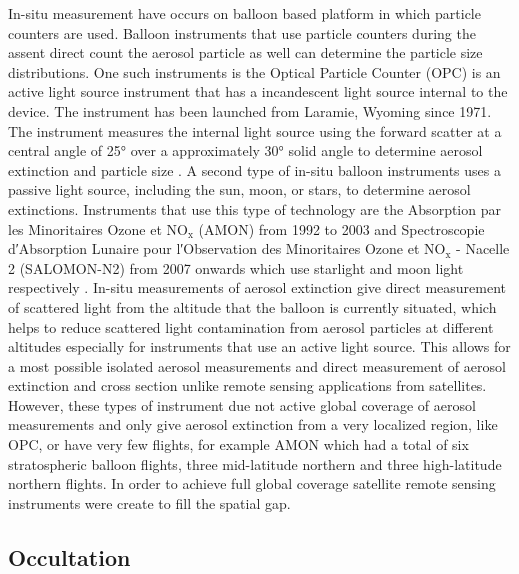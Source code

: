 In-situ measurement have occurs on balloon based platform in which particle counters are used. Balloon instruments that use particle counters during the assent direct count the aerosol particle as well can determine the particle size distributions. One such instruments is the Optical Particle Counter (OPC) is an active light source instrument that has a incandescent light source internal to the device. The instrument has been launched from Laramie, Wyoming since 1971. The instrument measures the internal light source using the forward scatter at a central angle of 25\si{\degree} over a approximately 30\si{\degree} solid angle to determine aerosol extinction and particle size \citep{Rosen1964, Deshler2003}. A second type of in-situ balloon instruments uses a passive light source, including the sun, moon, or stars, to determine aerosol extinctions. Instruments that use this type of technology are the Absorption par les Minoritaires Ozone et NO$_{\text{x}}$ (AMON) from 1992 to 2003 and Spectroscopie d\si{\arcminute}Absorption Lunaire pour l\si{\arcminute}Observation des Minoritaires Ozone et NO$_{\text{x}}$ - Nacelle 2 (SALOMON-N2) from 2007 onwards which use starlight and moon light respectively \citep{Berthet2002}. In-situ measurements of aerosol extinction give direct measurement of scattered light from the altitude that the balloon is currently situated, which helps to reduce scattered light contamination from aerosol particles at different altitudes especially for instruments that use an active light source. This allows for a most possible isolated aerosol measurements  and direct measurement of aerosol extinction and cross section unlike remote sensing applications from satellites. However, these types of instrument due not active global coverage of aerosol measurements and only give aerosol extinction from a very localized region, like OPC, or have very few flights, for example AMON which had a total of six stratospheric balloon flights, three mid-latitude northern and three high-latitude northern flights. In order to achieve full global coverage satellite remote sensing instruments were create to fill the spatial gap.

\subsection{Occultation}

